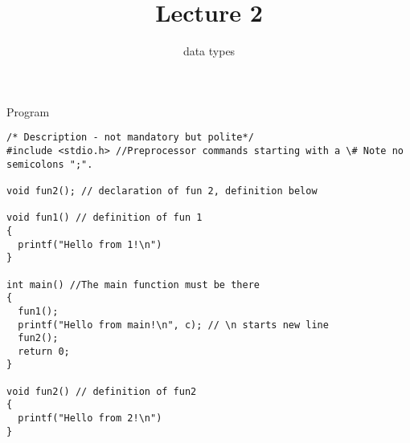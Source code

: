 \documentclass[10pt]{beamer}
\title{Lecture 2}
\subtitle{data types}
\date{}
\begin{document}
\frame{
    \titlepage
}


\begin{frame}[fragile]{Program}
    \begin{lstlisting}
/* Description - not mandatory but polite*/
#include <stdio.h> //Preprocessor commands starting with a \# Note no semicolons ";".

void fun2(); // declaration of fun 2, definition below

void fun1() // definition of fun 1
{
  printf("Hello from 1!\n")
}

int main() //The main function must be there
{
  fun1();
  printf("Hello from main!\n", c); // \n starts new line
  fun2();
  return 0;
}

void fun2() // definition of fun2
{
  printf("Hello from 2!\n")
}
   
    \end{lstlisting}
 
\end{frame}

\end{document}
